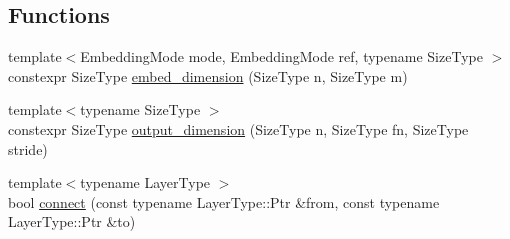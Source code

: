 \subsection*{Functions}
\begin{DoxyCompactItemize}
\item 
{\footnotesize template$<$Embedding\-Mode mode, Embedding\-Mode ref, typename Size\-Type $>$ }\\constexpr Size\-Type \hyperlink{namespaceffnn_1_1layer_ad128f693900faa5bcf2cdd0ef8e7eee6}{embed\-\_\-dimension} (Size\-Type n, Size\-Type m)
\item 
{\footnotesize template$<$typename Size\-Type $>$ }\\constexpr Size\-Type \hyperlink{namespaceffnn_1_1layer_ac1d8b4e852293231055d1257f1e83e60}{output\-\_\-dimension} (Size\-Type n, Size\-Type fn, Size\-Type stride)
\item 
{\footnotesize template$<$typename Layer\-Type $>$ }\\bool \hyperlink{namespaceffnn_1_1layer_a33fc9c6c7eb5fbdef14e0aa0db97dd13}{connect} (const typename Layer\-Type\-::\-Ptr \&from, const typename Layer\-Type\-::\-Ptr \&to)
\end{DoxyCompactItemize}


